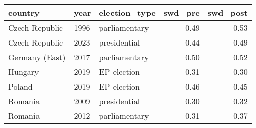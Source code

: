 
\begin{tabular}{l|l|l|r|r}
\hline
country & year & election\_type & swd\_pre & swd\_post\\
\hline
Czech Republic & 1996 & parliamentary & 0.49 & 0.53\\
\hline
Czech Republic & 2023 & presidential & 0.44 & 0.49\\
\hline
Germany (East) & 2017 & parliamentary & 0.50 & 0.52\\
\hline
Hungary & 2019 & EP election & 0.31 & 0.30\\
\hline
Poland & 2019 & EP election & 0.46 & 0.45\\
\hline
Romania & 2009 & presidential & 0.30 & 0.32\\
\hline
Romania & 2012 & parliamentary & 0.31 & 0.37\\
\hline
\end{tabular}

